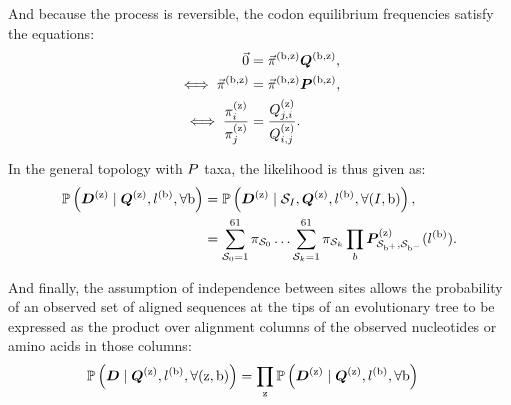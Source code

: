 And because the process is reversible, the codon equilibrium frequencies satisfy the equations:
\begin{align}
    \vec{0} & = \vec{\pi}^{(\text{b}, \text{z})} \bm{Q}^{(\text{b}, \text{z})}, \\
    \iff \vec{\pi}^{(\text{b}, \text{z})} & = \vec{\pi}^{(\text{b}, \text{z})} \bm{P}^{(\text{b}, \text{z})}, \\
    \iff \dfrac{\pi_{{i}}^{(\text{z})}}{\pi_{{j}}^{(\text{z})}} & = \dfrac{Q_{{j}, {i}}^{(\text{z})}}{Q_{{i}, {j}}^{(\text{z})}}.
\end{align}

In the general topology with $P$ taxa, the likelihood is thus given as:
\begin{align}
    \mathbb{P} \left(\bm{D}^{(\text{z})} \mid \bm{Q}^{(\text{z})}, l^{(\text{b})}, \forall \text{b} \right) & = \mathbb{P} \left(\bm{D}^{(\text{z})} \mid \mathcal{S}_{I}, \bm{Q}^{(\text{z})}, l^{(\text{b})}, \forall (I, \text{b}) \right), \\
    & = \sum\limits_{\mathcal{S}_{0}=1}^{61} \pi_{\mathcal{S}_{0}} \hdots \sum\limits_{\mathcal{S}_{k}=1}^{61} \pi_{\mathcal{S}_{k}} \prod\limits_{b} \bm{P}^{(\text{z})}_{\mathcal{S}_{\text{b}^{+}}, \mathcal{S}_{\text{b}^{-}}}(l^{(\text{b})}). \label{eq:likelihood-site}
\end{align}

And finally, the assumption of independence between sites allows the probability of an observed set of aligned sequences at the tips of an evolutionary tree to be expressed as the product over alignment columns of the observed nucleotides or amino acids in those columns:
\begin{align}
    \mathbb{P} \left(\bm{D} \mid \bm{Q}^{(\text{z})}, l^{(\text{b})}, \forall (\text{z}, \text{b}) \right) & = \prod\limits_{\text{z}} \mathbb{P} \left(\bm{D}^{(\text{z})} \mid \bm{Q}^{(\text{z})}, l^{(\text{b})}, \forall \text{b} \right) \label{eq:likelihood}
\end{align}

